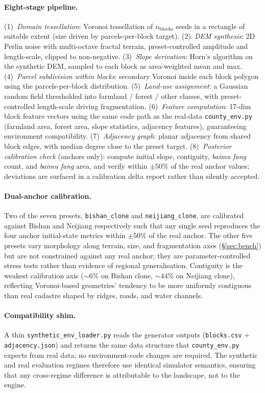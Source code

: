 \documentclass[11pt]{article}
\begin{document}
\paragraph{Eight-stage pipeline.} (1)~\emph{Domain tessellation}: Voronoi tessellation of $n_{\text{blocks}}$ seeds in a rectangle of suitable extent (size driven by parcels-per-block target). (2)~\emph{DEM synthesis}: 2D Perlin noise with multi-octave fractal terrain, preset-controlled amplitude and length-scale, clipped to non-negative. (3)~\emph{Slope derivation}: Horn's algorithm on the synthetic DEM, sampled to each block as area-weighted mean and max. (4)~\emph{Parcel subdivision within blocks}: secondary Voronoi inside each block polygon using the parcels-per-block distribution. (5)~\emph{Land-use assignment}: a Gaussian random field thresholded into farmland / forest / other classes, with preset-controlled length-scale driving fragmentation. (6)~\emph{Feature computation}: 17-dim block feature vectors using the same code path as the real-data \texttt{county\_env.py} (farmland area, forest area, slope statistics, adjacency features), guaranteeing environment compatibility. (7)~\emph{Adjacency graph}: planar adjacency from shared block edges, with median degree close to the preset target. (8)~\emph{Posterior calibration check} (anchors only): compute initial slope, contiguity, \textit{baimu fang} count, and \textit{baimu fang} area, and verify within $\pm 50\%$ of the real anchor values; deviations are surfaced in a calibration delta report rather than silently accepted.

\paragraph{Dual-anchor calibration.} Two of the seven presets, \texttt{bishan\_clone} and \texttt{neijiang\_clone}, are calibrated against Bishan and Neijiang respectively such that any single seed reproduces the four anchor initial-state metrics within $\pm 50\%$ of the real anchor. The other five presets vary morphology along terrain, size, and fragmentation axes (\S\ref{sec:bench}) but are not constrained against any real anchor; they are parameter-controlled stress tests rather than evidence of regional generalisation. Contiguity is the weakest calibration axis ($\sim$$6\%$ on Bishan clone, $\sim$$44\%$ on Neijiang clone), reflecting Voronoi-based geometries' tendency to be more uniformly contiguous than real cadastre shaped by ridges, roads, and water channels.

\paragraph{Compatibility shim.} A thin \texttt{synthetic\_env\_loader.py} reads the generator outputs (\texttt{blocks.csv} + \texttt{adjacency.json}) and returns the same data structure that \texttt{county\_env.py} expects from real data; no environment-code changes are required. The synthetic and real evaluation regimes therefore use identical simulator semantics, ensuring that any cross-regime difference is attributable to the landscape, not to the engine.
\end{document}
